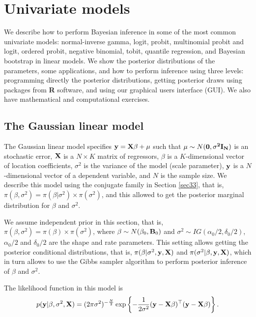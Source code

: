 \chapter{Univariate models}\label{chap6}

We describe how to perform Bayesian inference in some of the most common univariate models: normal-inverse gamma, logit, probit, multinomial probit and logit, ordered probit, negative binomial, tobit, quantile regression, and Bayesian bootstrap in linear models. We show the posterior distributions of the parameters, some applications, and how to perform inference using three levels: programming directly the posterior distributions, getting posterior draws using packages from \textbf{R} software, and using our graphical users interface (GUI). We also have mathematical and computational exercises.

\section{The Gaussian linear model}\label{sec61}

The Gaussian linear model specifies ${\bf{y}}={\bf{X}}\beta+\bf{\mu}$ such that $\mu\sim N(\bf{0},\sigma^2\bf{I}_N)$ is an stochastic error, ${\bf{X}}$ is a $N \times K$ matrix of regressors, $\beta$ is a $K$-dimensional vector of location coefficients, $\sigma^2$ is the variance of the model (scale parameter), ${\bf{y}}$ is a $N$-dimensional vector of a dependent variable, and $N$ is the sample size. We describe this model using the conjugate family in Section \ref{sec33}, that is, $\pi(\beta,\sigma^2)=\pi(\beta|\sigma^2)\times\pi(\sigma^2)$, and this allowed to get the posterior marginal distribution for $\beta$ and $\sigma^2$.

We assume independent prior in this section, that is, $\pi(\beta,\sigma^2)=\pi(\beta)\times\pi(\sigma^2)$, where $\beta \sim N(\beta_0, {\bf{B}}_0)$ and $\sigma^2 \sim IG(\alpha_0/2, \delta_0/2)$, $\alpha_0/2$ and $\delta_0/2$ are the shape and rate parameters. This setting allows getting the posterior conditional distributions, that is, $\pi(\beta|\sigma^2,{\bf{y}}, {\bf{X}})$ and $\pi(\sigma^2|\beta,{\bf{y}}, {\bf{X}})$, which in turn allows to use the Gibbs sampler algorithm to perform posterior inference of $\beta$ and $\sigma^2$.

The likelihood function in this model is
\begin{align*}
	p({\bf{y}}| \beta, \sigma^2, {\bf{X}}) = (2\pi\sigma^2)^{-\frac{N}{2}} \exp \left\{-\frac{1}{2\sigma^2} ({\bf{y}} - \bf{X\beta})^{\top}({\bf{y}} - \bf{X\beta}) \right\}.
\end{align*}

